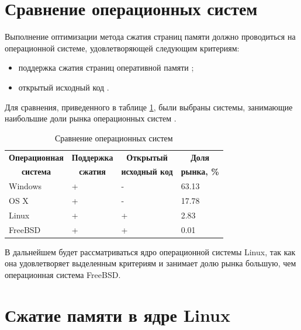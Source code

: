\section{Сравнение операционных систем}\label{os}

Выполнение оптимизации метода сжатия страниц памяти должно проводиться на операционной системе, удовлетворяющей следующим критериям:

\begin{itemize}
	\item поддержка сжатия страниц оперативной памяти \cite{swapping};
	\item открытый исходный код \cite{open-os}.
\end{itemize}

Для сравнения, приведенного в таблице \ref{tab:comparison-os}, были выбраны системы, занимающие наибольшие доли рынка операционных систем \cite{stat}.

\begin{table}[h]
    \caption{Сравнение операционных систем}
    \begin{center}
        \begin{tabular}{|l|l|l|l|}
        		\hline
            \multicolumn{1}{|c}{\textbf{Операционная}} & 
            \multicolumn{1}{|c|}{\textbf{Поддержка}} &
            \multicolumn{1}{c|}{\textbf{Открытый}} &
            \multicolumn{1}{c|}{\textbf{Доля}} \\
            \multicolumn{1}{|c}{\textbf{система}} & 
            \multicolumn{1}{|c|}{\textbf{сжатия}} &
            \multicolumn{1}{c|}{\textbf{исходный код}} &
            \multicolumn{1}{c|}{\textbf{рынка, \%}} \\ \hline
            Windows &  + & - & 63.13 \\ \hline
            OS X & + & - & 17.78 \\ \hline
            Linux & + & + & 2.83 \\ \hline
            FreeBSD & + & + & 0.01 \\ \hline
        \end{tabular}
    \end{center}
    \label{tab:comparison-os}
\end{table}

В дальнейшем будет рассматриваться ядро операционной системы Linux, так как она удовлетворяет выделенным критериям и занимает долю рынка большую, чем операционная система FreeBSD.

\section{Сжатие памяти в ядре Linux}\label{linux-compression}

